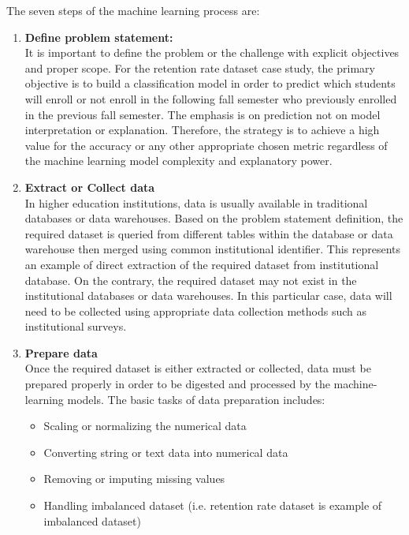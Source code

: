 \documentclass[12pt,a4paper,oneside]{book}
\begin{document}
\par The seven steps of the machine learning process are:

\begin{enumerate}

\item \textbf{Define problem statement:}\\
It is important to define the problem or the challenge with explicit objectives and proper scope. For the retention rate dataset case study, the primary objective is to build a classification model in order to predict which students will enroll or not enroll in the following fall semester who previously enrolled in the previous fall semester. The emphasis is on prediction not on model interpretation or explanation. Therefore, the strategy is to achieve a high value for the accuracy or any other appropriate chosen metric regardless of the machine learning model complexity and explanatory power.    

\item \textbf{Extract or Collect data }\\
In higher education institutions, data is usually available in traditional databases or data warehouses. Based on the problem statement definition, the required dataset is queried from different tables within the database or data warehouse then merged using common institutional identifier. This represents an example of direct extraction of the required dataset from institutional database.  On the contrary, the required dataset may not exist in the institutional databases or data warehouses. In this particular case, data will need to be collected using appropriate data collection methods such as institutional surveys.    

\item \textbf{Prepare data}\\
Once the required dataset is either extracted or collected, data must be prepared properly in order to be digested and processed by the machine-learning models. The basic tasks of data preparation includes:

\begin{itemize}

\item Scaling or normalizing the numerical data 
\item Converting string or text data into numerical data  
\item Removing or imputing missing values
\item Handling imbalanced dataset (i.e. retention rate dataset is example of imbalanced dataset)


\end{itemize}
\end{enumerate}
\end{document}
